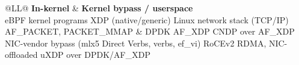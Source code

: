 \documentclass[11pt,a4paper]{article}
\begin{document}
\begin{table}[!t]
\centering
\small
\begin{tabularx}{\textwidth}{@{}LL@{}}
\toprule
\textbf{In-kernel} & \textbf{Kernel bypass / userspace} \\
\midrule
eBPF kernel programs \cite{uxdp2025}\newline
\hspace*{1em}XDP (native/generic) \cite{uxdp2025}\newline
Linux network stack (TCP/IP) \cite{okmoon2026}\newline
\hspace*{1em}AF\_PACKET, PACKET\_MMAP \cite{valia2026,packetio2026,abtrda3}
&
DPDK \cite{valia2026,uxdp2025,packetio2026,abtrda3}\newline
AF\_XDP \cite{valia2026,uxdp2025,packetio2026,abtrda3}\newline
CNDP over AF\_XDP \cite{valia2026}\newline
NIC-vendor bypass (mlx5 Direct Verbs, verbs, ef\_vi) \cite{packetio2026,abtrda3}\newline
RoCEv2 RDMA, NIC-offloaded \cite{okmoon2026}\newline
uXDP over DPDK/AF\_XDP \cite{uxdp2025} \\
\bottomrule
\end{tabularx}
\end{table}
\end{document}
